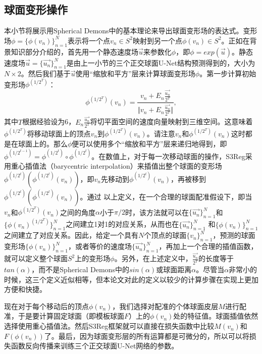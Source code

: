 \subsection{球面变形操作}\label{sec:球面变形层}
本小节将展示用Spherical Demons\cite{yeo2009spherical}中的基本理论来导出球面变形场的表达式。变形场$\phi=\{\phi(v_n)\}_{n=1}^N$表示将一个点$v_n\in S^2 $映射到另一个点$\phi(v_n)\in S^2$。正如在背景知识部分介绍的，首先用一个静态速度场$\overrightarrow{u}$来参数化$\phi$，即$\phi=exp(\overrightarrow{u})$。静态速度场$\overrightarrow{u}=\{\overrightarrow{u_n}\}_{n=1}^N$是由上一小节的三个正交球面U-Net结构预测得到的，大小为$N\times2$。然后我们基于$\overrightarrow{u}$使用“缩放和平方”层来计算球面变形场$\phi$。第一步计算初始变形场$\phi^{(1/2^T)}$：
\begin{equation}
\phi^{(1/2^T)}(v_n)=\frac{v_n+E_n\frac{\overrightarrow{u_n}}{2^T}}{\Vert v_n+E_n\frac{\overrightarrow{u_n}}{2^T} \Vert}, 
\end{equation}
其中$T$根据经验设为6，$E_n \frac{\overrightarrow{u_n}}{2^T}$将切平面空间的速度向量映射到三维空间。这意味着$\phi^{(1/2^T)}$将移动球面上的顶点$v_n$到$\phi^{(1/2^T)}(v_n)$。请注意$v_n$和$\phi^{(1/2^T)}(v_n)$这时都是在球面上的。那么$\phi$便可以使用多个“缩放和平方”层来递归地得到，即$\phi^{(1/2^{t-1})}=\phi^{(1/2^t)}\circ\phi^{(1/2^t)}$。在数值上，对于每一次移动球面的操作，S3Reg采用重心插值法（barycentric interpolation）来插值出整个球面的变形场$\phi^{(1/2^t)}(\phi^{(1/2^t)}(v_n))$，即$v_n$先移动到$\phi^{(1/2^t)}(v_n)$，再被移到$\phi^{(1/2^t)}(\phi^{(1/2^t)}(v_n))$。通过
以上定义，在一个合理的球面配准假设下，即当$v_n$和$\phi^{(1/2^T)}(v_n)$之间的角度$\alpha$小于$\pi/2$时，该方法就可以在$\{\overrightarrow{u_n}\}_{n=1}^N$和$\{\phi(v_n)^{(1/2^T)}\}_{n=1}^N$之间建立1对1的对应关系，从而也在$\{\overrightarrow{u_n}\}_{n=1}^N$ 和$\{\phi(v_n)\}_{n=1}^N$之间建立了对应关系。因此，给定一个具有$N$个顶点的球面$\{{v_n}\}_{n=1}^N$，预测的球面变形场$\{\phi(v_n)\}_{n=1}^N$，或者等价的速度场$\{\overrightarrow{u_n}\}_{n=1}^N$，再加上一个合理的插值函数，就可以定义整个球面$S^2$上的变形场$\phi$。另外，在上述定义中，$\frac{\overrightarrow{u_n}}{2^T}$的长度等于$tan(\alpha)$，而不是Spherical Demons中的$sin(\alpha)$或球面距离$\alpha$。尽管当$\alpha$非常小的时候，这三个定义近似相等，但本论文对此的定义以较少的计算步骤在实现上更加方便和快捷。

现在对于每个移动后的顶点$\phi(v_n)$，我们选择对配准的个体球面皮层$M$进行配准，于是要计算固定球面（即模板球面$F$）上的$\phi(v_n)$处的特征值。球面插值依然选择使用重心插值法。然后S3Reg框架就可以直接在损失函数中比较$M(v_n)$和$F(\phi(v_n))$了。最后，因为球面变形层的所有运算都是可微分的，所以可以将损失函数反向传播来训练三个正交球面U-Net网络的参数。


